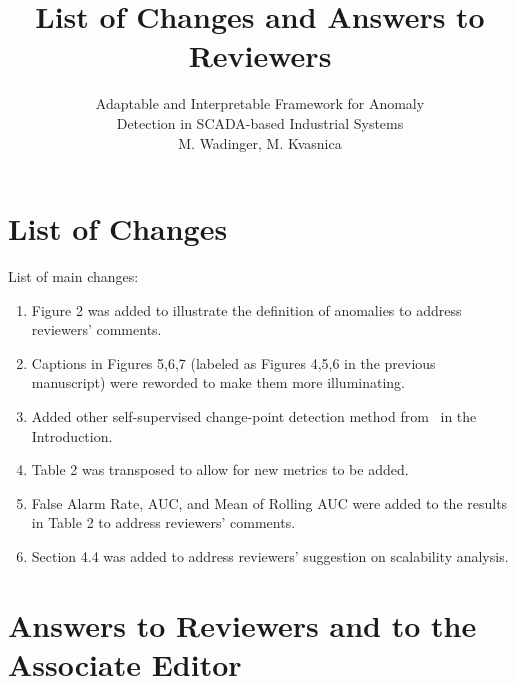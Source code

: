 \documentclass{article}
\title{List of Changes and Answers to Reviewers}
\author{Adaptable and Interpretable Framework for Anomaly\\Detection in SCADA-based Industrial Systems
  \\M. Wadinger, M. Kvasnica}
\begin{document}
\maketitle


\section{List of Changes}

List of main changes:
\begin{enumerate}

  \item Figure 2 was added to illustrate the definition of anomalies to address reviewers' comments.
  \item Captions in Figures 5,6,7 (labeled as Figures 4,5,6 in the previous manuscript) were reworded to make them more illuminating.
  \item Added other self-supervised change-point detection method from~\cite{Deldari2021} in the Introduction.
  \item Table 2 was transposed to allow for new metrics to be added.
  \item False Alarm Rate, AUC, and Mean of Rolling AUC were added to the results in Table 2 to address reviewers' comments.
  \item Section 4.4 was added to address reviewers' suggestion on scalability analysis.
\end{enumerate}

\section{Answers to Reviewers and to the Associate Editor}
\end{document}
